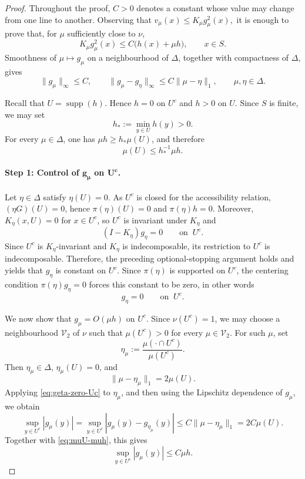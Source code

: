 \documentclass[10pt,letterpaper]{article}
\theoremstyle{compactplain}
\theoremstyle{compactdefinition}
\DeclareMathOperator{\supp}{supp}
\newcommand{\1}{\mathds{1}}
\begin{document}
\begin{proof}
Throughout the proof, \(C>0\) denotes a constant whose value may change from one line to another.
Observing that \(v_\mu(x) \leq K_\mu g_\mu^2(x),\) it is enough to prove that, for \(\mu\) sufficiently close to \(\nu\),
\[
K_\mu g_\mu^2(x)
\leq
C\bigl(h(x)+\mu h\bigr),
\qquad x\in S.
\]
Smoothness of \(\mu\mapsto g_\mu\) on a neighbourhood of \(\Delta\), together with compactness of \(\Delta\), gives
\[
\|g_\mu\|_\infty\leq C,
\qquad
\|g_\mu-g_\eta\|_\infty
\leq
C\|\mu-\eta\|_1,
\qquad
\mu,\eta\in\Delta.
\]

Recall that \(U=\supp(h)\). Hence \(h=0\) on \(U^c\) and \(h>0\) on \(U\).
Since \(S\) is finite, we may set
\[
h_*:=\min_{y\in U}h(y)>0.
\]
For every \(\mu\in\Delta\), one has \(\mu h\geq h_*\mu(U)\), and therefore
\begin{equation}
\label{eq:muU-muh}
\mu(U)\leq h_*^{-1}\mu h.
\end{equation}

\paragraph{Step 1: Control of \(\boldsymbol{g_\mu}\) on \(\boldsymbol{U^c}\).}
Let \(\eta\in\Delta\) satisfy \(\eta(U)=0\). As \(U^c\) is closed for the accessibility relation,
\((\eta G)(U)=0\), hence \(\pi(\eta)(U)=0\) and
\(\pi(\eta)h=0\). Moreover,
\(K_\eta(x,U)=0\) for \(x\in U^c\), so \(U^c\) is invariant under \(K_\eta\) and
\[
(I-K_\eta)g_\eta=0
\qquad\text{on } \ U^c.
\]
Since \(U^c\) is \(K_\eta\)-invariant and \(K_\eta\) is indecomposable, its restriction to \(U^c\) is indecomposable. Therefore, the preceding optional-stopping argument holds and yields that \(g_\eta\) is constant on \(U^c\). Since \(\pi(\eta)\) is supported on
\(U^c\), the centering condition \(\pi(\eta)g_\eta=0\) forces this constant to be zero, in other words
\begin{equation}
\label{eq:geta-zero-Uc}
g_\eta=0
\qquad\text{on } \ U^c.
\end{equation}


We now show that $g_\mu = O(\mu h)$ on $U^c$.  Since \(\nu(U^c)=1\), we may choose a neighbourhood
\(\mathcal V_2\) of \(\nu\) such that \(\mu(U^c)>0\) for every
\(\mu\in\mathcal V_2\). For such \(\mu\), set
\[
\eta_\mu
:=
\frac{\mu(\cdot\cap U^c)}{\mu(U^c)}.
\]
Then \(\eta_\mu\in\Delta\),
\(\eta_\mu(U)=0\), and
\[
\|\mu-\eta_\mu\|_1=2\mu(U).
\]
Applying \eqref{eq:geta-zero-Uc} to \(\eta_\mu\), and then using the Lipschitz
dependence of \(g_\mu\), we obtain
\[
\sup_{y\in U^c}|g_\mu(y)|
=
\sup_{y\in U^c}|g_\mu(y)-g_{\eta_\mu}(y)|
\leq
C\|\mu-\eta_\mu\|_1
=
2C\mu(U).
\]
Together with \eqref{eq:muU-muh}, this gives
\begin{equation}
\label{eq:gmu-Uc-bound}
\sup_{y\in U^c}|g_\mu(y)|
\leq
C\mu h.
\end{equation}


\end{proof}
\end{document}
